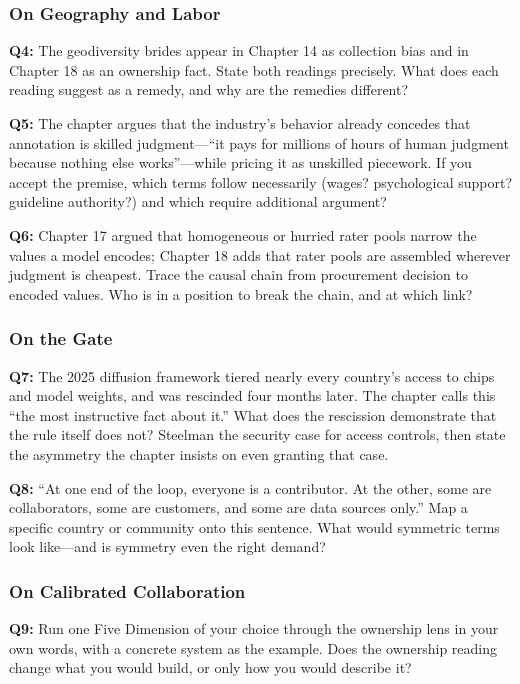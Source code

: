 \subsubsection*{On Geography and Labor}

\textbf{Q4:} The geodiversity brides appear in Chapter 14 as collection bias and in Chapter 18 as an ownership fact. State both readings precisely. What does each reading suggest as a remedy, and why are the remedies different?

\textbf{Q5:} The chapter argues that the industry's behavior already concedes that annotation is skilled judgment---``it pays for millions of hours of human judgment because nothing else works''---while pricing it as unskilled piecework. If you accept the premise, which terms follow necessarily (wages? psychological support? guideline authority?) and which require additional argument?

\textbf{Q6:} Chapter 17 argued that homogeneous or hurried rater pools narrow the values a model encodes; Chapter 18 adds that rater pools are assembled wherever judgment is cheapest. Trace the causal chain from procurement decision to encoded values. Who is in a position to break the chain, and at which link?

\subsubsection*{On the Gate}

\textbf{Q7:} The 2025 diffusion framework tiered nearly every country's access to chips and model weights, and was rescinded four months later. The chapter calls this ``the most instructive fact about it.'' What does the rescission demonstrate that the rule itself does not? Steelman the security case for access controls, then state the asymmetry the chapter insists on even granting that case.

\textbf{Q8:} ``At one end of the loop, everyone is a contributor. At the other, some are collaborators, some are customers, and some are data sources only.'' Map a specific country or community onto this sentence. What would symmetric terms look like---and is symmetry even the right demand?

\subsubsection*{On Calibrated Collaboration}

\textbf{Q9:} Run one Five Dimension of your choice through the ownership lens in your own words, with a concrete system as the example. Does the ownership reading change what you would build, or only how you would describe it?

